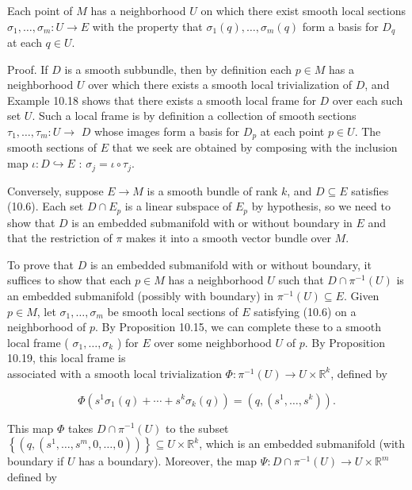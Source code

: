 \documentclass[10pt, letterpaper]{article}
\begin{document}
\begin{displayquote}
Each point of $M$ has a neighborhood $U$ on which there exist smooth local sections $\sigma_{1}, \ldots, \sigma_{m}: U \rightarrow E$ with the property that $\sigma_{1}(q), \ldots, \sigma_{m}(q)$ form a basis for $D_{q}$ at each $q \in U$.
\end{displayquote}

Proof. If $D$ is a smooth subbundle, then by definition each $p \in M$ has a neighborhood $U$ over which there exists a smooth local trivialization of $D$, and Example 10.18 shows that there exists a smooth local frame for $D$ over each such set $U$. Such a local frame is by definition a collection of smooth sections $\tau_{1}, \ldots, \tau_{m}: U \rightarrow$ $D$ whose images form a basis for $D_{p}$ at each point $p \in U$. The smooth sections of $E$ that we seek are obtained by composing with the inclusion map $\iota: D \hookrightarrow E$ : $\sigma_{j}=\iota \circ \tau_{j}$.

Conversely, suppose $E \rightarrow M$ is a smooth bundle of rank $k$, and $D \subseteq E$ satisfies (10.6). Each set $D \cap E_{p}$ is a linear subspace of $E_{p}$ by hypothesis, so we need to show that $D$ is an embedded submanifold with or without boundary in $E$ and that the restriction of $\pi$ makes it into a smooth vector bundle over $M$.

To prove that $D$ is an embedded submanifold with or without boundary, it suffices to show that each $p \in M$ has a neighborhood $U$ such that $D \cap \pi^{-1}(U)$ is an embedded submanifold (possibly with boundary) in $\pi^{-1}(U) \subseteq E$. Given $p \in M$, let $\sigma_{1}, \ldots, \sigma_{m}$ be smooth local sections of $E$ satisfying (10.6) on a neighborhood of $p$. By Proposition 10.15, we can complete these to a smooth local frame ( $\sigma_{1}, \ldots, \sigma_{k}$ ) for $E$ over some neighborhood $U$ of $p$. By Proposition 10.19, this local frame is\\
associated with a smooth local trivialization $\Phi: \pi^{-1}(U) \rightarrow U \times \mathbb{R}^{k}$, defined by

$$
\Phi\left(s^{1} \sigma_{1}(q)+\cdots+s^{k} \sigma_{k}(q)\right)=\left(q,\left(s^{1}, \ldots, s^{k}\right)\right) .
$$

This map $\Phi$ takes $D \cap \pi^{-1}(U)$ to the subset $\left\{\left(q,\left(s^{1}, \ldots, s^{m}, 0, \ldots, 0\right)\right)\right\} \subseteq U \times \mathbb{R}^{k}$, which is an embedded submanifold (with boundary if $U$ has a boundary). Moreover, the map $\Psi: D \cap \pi^{-1}(U) \rightarrow U \times \mathbb{R}^{m}$ defined by
\end{document}
